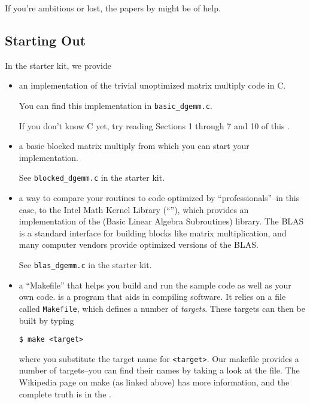 \documentclass[11pt]{article}
\begin{document}
\begin{enumerate}
If you're ambitious or lost, the papers by
\citet{lam1991cache,bilmes1997optimizing,whaley_automated_2001} might
be of help.

\subsection*{Starting Out}

In the starter kit, we provide
\begin{itemize}
  \item an implementation of the trivial unoptimized matrix multiply
  code in C.

  You can find this implementation in \verb|basic_dgemm.c|.

  If you don't know C yet, try reading Sections 1 through 7 and 10
  of this
  .

  \item a basic blocked matrix multiply from which
  you can start your implementation.

  See \verb|blocked_dgemm.c| in the starter kit.

  \item a way to compare your routines to code optimized by
  ``professionals''--in this case, to the Intel Math Kernel Library
  (``''),
  which provides an implementation of the
  (Basic Linear Algebra Subroutines) library. The BLAS is a standard
  interface for building blocks like matrix multiplication, and many
  computer vendors provide optimized versions of the BLAS.

  See \verb|blas_dgemm.c| in the starter kit.

  \item a ``Makefile'' that helps you build and run the sample
    code as well as your own code.
     is
    a program that aids in compiling software. It relies on a file
    called \texttt{Makefile}, which defines a number of
    \emph{targets}. These targets can then be built by typing
    \begin{lstlisting}
$ make <target>
\end{lstlisting}
    where you substitute the target name for \verb|<target>|.  Our
    makefile provides a number of targets--you can find their names by
    taking a look at the file. The Wikipedia page on make (as linked
    above) has more information, and the complete truth is in the
    .


\end{itemize}
\end{enumerate}
\end{document}
